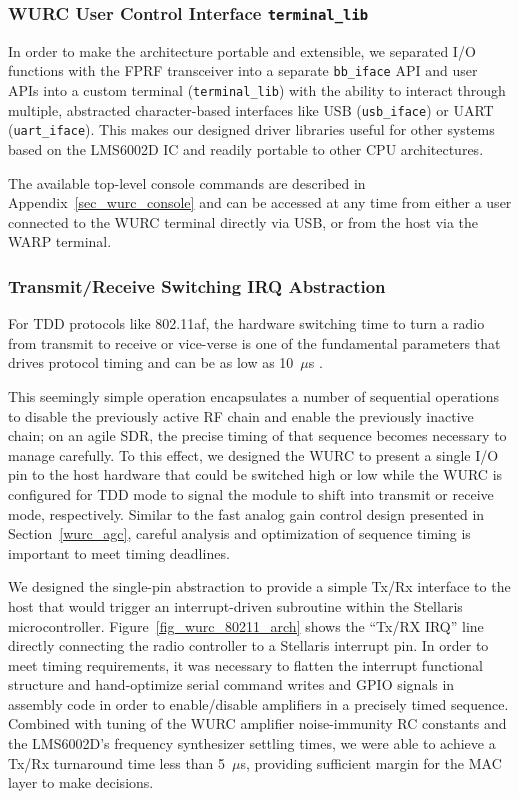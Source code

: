 \subsubsection{WURC User Control Interface \texttt{terminal\_lib}}
\label{sec_wurc_terminal}

	In order to make the architecture portable and extensible, we separated I/O functions with the \ac{FPRF} transceiver into a separate \texttt{bb\_iface} \ac{API} and user \acp{API} into a custom terminal (\texttt{terminal\_lib}) with the ability to interact through multiple, abstracted character-based interfaces like \ac{USB} (\texttt{usb\_iface}) or \ac{UART} (\texttt{uart\_iface}).
	This makes our designed driver libraries useful for other systems based on the LMS6002D \ac{IC} and readily portable to other CPU architectures.

	The available top-level console commands are described in Appendix~\ref{sec_wurc_console} and can be accessed at any time from either a user connected to the \ac{WURC} terminal directly via \ac{USB}, or from the host via the WARP terminal.

\subsubsection{Transmit/Receive Switching IRQ Abstraction}
\label{sec_txrx_switching}

For \ac{TDD} protocols like 802.11af, the hardware switching time to turn a radio from transmit to receive or vice-verse is one of the fundamental parameters that drives protocol timing and can be as low as 10~$\mu$s \cite{std11af}.

	This seemingly simple operation encapsulates a number of sequential operations to disable the previously active RF chain and enable the previously inactive chain; on an agile \ac{SDR}, the precise timing of that sequence becomes necessary to manage carefully.
	To this effect, we designed the \ac{WURC} to present a single I/O pin to the host hardware that could be switched high or low while the \ac{WURC} is configured for \ac{TDD} mode to signal the module to shift into transmit or receive mode, respectively.
	Similar to the fast analog gain control design presented in Section~\ref{wurc_agc}, careful analysis and optimization of sequence timing is important to meet timing deadlines.

	We designed the single-pin abstraction to provide a simple Tx/Rx interface to the host that would trigger an interrupt-driven subroutine within the Stellaris microcontroller.
	Figure~\ref{fig_wurc_80211_arch} shows the ``Tx/RX IRQ'' line directly connecting the radio controller to a Stellaris interrupt pin.
	In order to meet timing requirements, it was necessary to flatten the interrupt functional structure and hand-optimize serial command writes and GPIO signals in assembly code in order to enable/disable amplifiers in a precisely timed sequence.
	Combined with tuning of the \ac{WURC} amplifier noise-immunity RC constants and the LMS6002D's frequency synthesizer settling times, we were able to achieve a Tx/Rx turnaround time less than 5~$\mu$s, providing sufficient margin for the MAC layer to make decisions.
	
